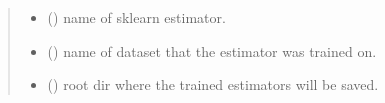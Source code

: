 \documentclass[letterpaper,10pt,english]{sphinxmanual}
\begin{document}
\begin{fulllineitems}
\begin{fulllineitems}
\begin{quote}
\begin{description}
\begin{itemize}
\item {} 
 () \textendash{} name of sklearn estimator.

\item {} 
 () \textendash{} name of dataset that the estimator was trained on.

\item {} 
 () \textendash{} root dir where the trained estimators will be saved.

\end{itemize}

\end{description}\end{quote}

\end{fulllineitems}


\end{fulllineitems}

\end{document}
